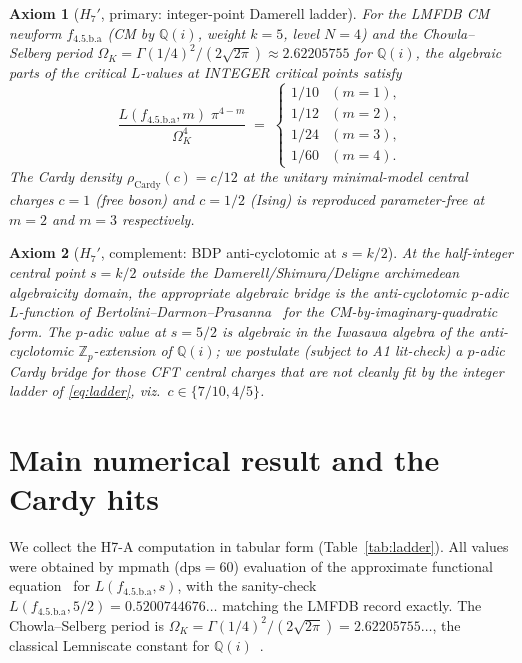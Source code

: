 \documentclass[a4paper,11pt]{article}
\newcommand{\OmK}{\Omega_K}
\newcommand{\fLM}{f_{\text{4.5.b.a}}}
\newcommand{\Qi}{\mathbb{Q}(i)}
\newtheorem*{axiom*}{Axiom}
\theoremstyle{definition}
\theoremstyle{remark}
\begin{document}
\begin{axiom*}[$H_7'$, primary: integer-point Damerell ladder]
For the LMFDB CM newform $\fLM$ (CM by $\Qi$, weight $k=5$, level
$N=4$) and the Chowla--Selberg period
$\OmK = \Gamma(1/4)^{2}/(2\sqrt{2\pi})\approx 2.62205755$ for $\Qi$,
the algebraic parts of the critical $L$-values at INTEGER critical
points satisfy
\begin{equation}
\label{eq:ladder}
  \frac{L(\fLM,m)\;\pi^{4-m}}{\OmK^{4}}
  \;=\;
  \begin{cases}
    1/10  & (m=1),\\
    1/12  & (m=2),\\
    1/24  & (m=3),\\
    1/60  & (m=4).
  \end{cases}
\end{equation}
The Cardy density $\rho_{\mathrm{Cardy}}(c)=c/12$ at the unitary
minimal-model central charges $c=1$ (free boson) and $c=1/2$
(Ising) is reproduced \emph{parameter-free} at $m=2$ and $m=3$
respectively.
\end{axiom*}

\begin{axiom*}[$H_7'$, complement: BDP anti-cyclotomic at $s=k/2$]
At the half-integer central point $s=k/2$ outside the
Damerell/Shimura/Deligne archimedean algebraicity domain, the
appropriate algebraic bridge is the anti-cyclotomic $p$-adic
$L$-function of Bertolini--Darmon--Prasanna~\cite{BDP13} for the
CM-by-imaginary-quadratic form.  The $p$-adic value at $s=5/2$ is
algebraic in the Iwasawa algebra of the anti-cyclotomic
$\mathbb{Z}_p$-extension of $\Qi$; we postulate (subject to A1
lit-check) a $p$-adic Cardy bridge for those CFT central charges that
are \emph{not} cleanly fit by the integer ladder of
\eqref{eq:ladder}, viz.\ $c\in\{7/10,4/5\}$.
\end{axiom*}

\section{Main numerical result and the Cardy hits}
\label{sec:main}

We collect the H7-A computation in tabular form
(Table~\ref{tab:ladder}).  All values were obtained by mpmath
($\mathrm{dps}=60$) evaluation of the approximate functional
equation~\cite[Thm.~5.3]{IwaKow04} for $L(\fLM,s)$, with the
sanity-check $L(\fLM,5/2)=0.5200744676\ldots$ matching the LMFDB
record exactly.  The Chowla--Selberg period is
$\OmK = \Gamma(1/4)^{2}/(2\sqrt{2\pi}) = 2.62205755\ldots$, the
classical Lemniscate constant for $\Qi$~\cite{ChowSel49}.
\end{document}
